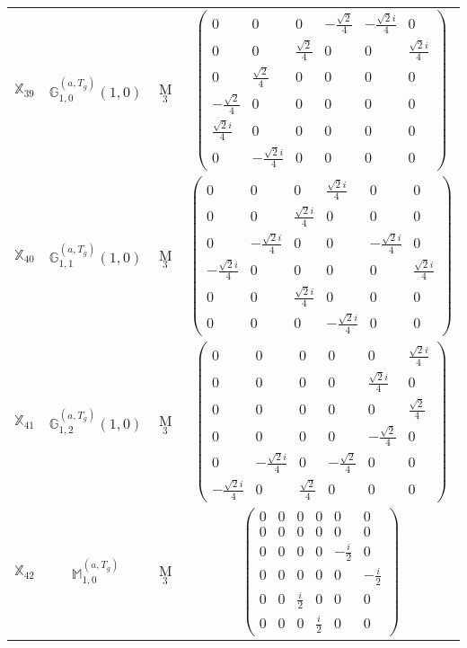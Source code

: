 \documentclass[fleqn,10pt,landscape]{article}
\begin{document}
\begin{itemize}
\begin{center}
\begin{longtable}{c|c|c|c}
$ \mathbb{X}_{39} $ & $\mathbb{G}_{1,0}^{(a,T_{g})}(1,0)$ & M$_{3}$ & $\begin{pmatrix} 0 & 0 & 0 & - \frac{\sqrt{2}}{4} & - \frac{\sqrt{2} i}{4} & 0 \\ 0 & 0 & \frac{\sqrt{2}}{4} & 0 & 0 & \frac{\sqrt{2} i}{4} \\ 0 & \frac{\sqrt{2}}{4} & 0 & 0 & 0 & 0 \\ - \frac{\sqrt{2}}{4} & 0 & 0 & 0 & 0 & 0 \\ \frac{\sqrt{2} i}{4} & 0 & 0 & 0 & 0 & 0 \\ 0 & - \frac{\sqrt{2} i}{4} & 0 & 0 & 0 & 0 \end{pmatrix}$ \\
$ \mathbb{X}_{40} $ & $\mathbb{G}_{1,1}^{(a,T_{g})}(1,0)$ & M$_{3}$ & $\begin{pmatrix} 0 & 0 & 0 & \frac{\sqrt{2} i}{4} & 0 & 0 \\ 0 & 0 & \frac{\sqrt{2} i}{4} & 0 & 0 & 0 \\ 0 & - \frac{\sqrt{2} i}{4} & 0 & 0 & - \frac{\sqrt{2} i}{4} & 0 \\ - \frac{\sqrt{2} i}{4} & 0 & 0 & 0 & 0 & \frac{\sqrt{2} i}{4} \\ 0 & 0 & \frac{\sqrt{2} i}{4} & 0 & 0 & 0 \\ 0 & 0 & 0 & - \frac{\sqrt{2} i}{4} & 0 & 0 \end{pmatrix}$ \\
$ \mathbb{X}_{41} $ & $\mathbb{G}_{1,2}^{(a,T_{g})}(1,0)$ & M$_{3}$ & $\begin{pmatrix} 0 & 0 & 0 & 0 & 0 & \frac{\sqrt{2} i}{4} \\ 0 & 0 & 0 & 0 & \frac{\sqrt{2} i}{4} & 0 \\ 0 & 0 & 0 & 0 & 0 & \frac{\sqrt{2}}{4} \\ 0 & 0 & 0 & 0 & - \frac{\sqrt{2}}{4} & 0 \\ 0 & - \frac{\sqrt{2} i}{4} & 0 & - \frac{\sqrt{2}}{4} & 0 & 0 \\ - \frac{\sqrt{2} i}{4} & 0 & \frac{\sqrt{2}}{4} & 0 & 0 & 0 \end{pmatrix}$ \\
$ \mathbb{X}_{42} $ & $\mathbb{M}_{1,0}^{(a,T_{g})}$ & M$_{3}$ & $\begin{pmatrix} 0 & 0 & 0 & 0 & 0 & 0 \\ 0 & 0 & 0 & 0 & 0 & 0 \\ 0 & 0 & 0 & 0 & - \frac{i}{2} & 0 \\ 0 & 0 & 0 & 0 & 0 & - \frac{i}{2} \\ 0 & 0 & \frac{i}{2} & 0 & 0 & 0 \\ 0 & 0 & 0 & \frac{i}{2} & 0 & 0 \end{pmatrix}$ \\

\end{longtable}
\end{center}
\end{itemize}
\end{document}
